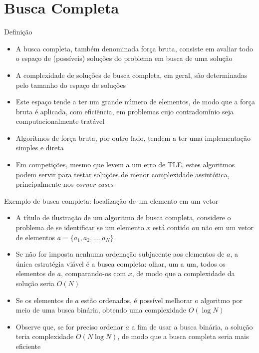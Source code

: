 \section{Busca Completa}

\begin{frame}[fragile]{Definição}

    \begin{itemize}
        \item A busca completa, também denominada força bruta, consiste em avaliar todo o
            espaço de (possíveis) soluções do problema em busca de uma solução

        \item A complexidade de soluções de busca completa, em geral, são determinadas pelo
            tamanho do espaço de soluções

        \item Este espaço tende a ter um grande número de elementos, de modo que a força
            bruta é aplicada, com eficiência, em problemas cujo contradomínio seja 
            computacionalmente tratável

        \item Algoritmos de força bruta, por outro lado, tendem a ter uma implementação simples e
            direta

        \item Em competições, mesmo que levem a um erro de TLE, estes algoritmos podem servir para 
            testar soluções de menor complexidade assintótica, principalmente nos 
            \textit{corner cases}
    \end{itemize}

\end{frame}

\begin{frame}[fragile]{Exemplo de busca completa: localização de um elemento em um vetor}

    \begin{itemize}
        \item A título de ilustração de um algoritmo de busca completa, considere o problema
            de se identificar se um elemento $x$ está contido ou não em um vetor de elementos
            $a = \lbrace a_1, a_2, \ldots, a_N\rbrace$

        \item Se não for imposta nenhuma ordenação subjacente aos elementos de $a$, a única
            estratégia viável é a busca completa: olhar, um a um, todos os elementos de $a$,
            comparando-os com $x$, de modo que a complexidade da solução seria $O(N)$

        \item Se os elementos de $a$ estão ordenados, é possível melhorar o algoritmo por 
            meio de uma busca binária, obtendo uma complexidade $O(\log N)$

        \item Observe que, se for preciso ordenar $a$ a fim de usar a busca binária, a solução teria
            complexidade $O(N\log N)$, de modo que a busca completa seria mais eficiente
    \end{itemize}

\end{frame}


